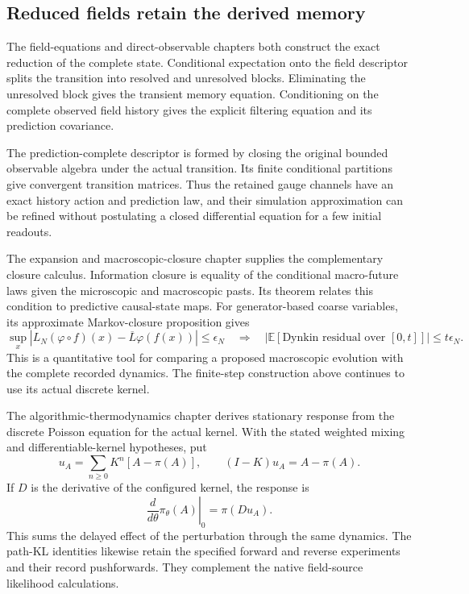 \documentclass[11pt,a4paper]{article}
\begin{document}
\subsection*{Reduced fields retain the derived memory}
The field-equations and direct-observable chapters both construct the exact reduction of the complete state. Conditional expectation onto the field descriptor splits the transition into resolved and unresolved blocks. Eliminating the unresolved block gives the transient memory equation. Conditioning on the complete observed field history gives the explicit filtering equation and its prediction covariance.

The prediction-complete descriptor is formed by closing the original bounded observable algebra under the actual transition. Its finite conditional partitions give convergent transition matrices. Thus the retained gauge channels have an exact history action and prediction law, and their simulation approximation can be refined without postulating a closed differential equation for a few initial readouts.

The expansion and macroscopic-closure chapter supplies the complementary closure calculus. Information closure is equality of the conditional macro-future laws given the microscopic and macroscopic pasts. Its theorem relates this condition to predictive causal-state maps. For generator-based coarse variables, its approximate Markov-closure proposition gives
\[
\sup_x|L_N(\varphi\circ f)(x)-\overline L\varphi(f(x))|
\le\epsilon_N
\quad\Longrightarrow\quad
|\mathbb E[\text{Dynkin residual over }[0,t]]|\le t\epsilon_N.
\]
This is a quantitative tool for comparing a proposed macroscopic evolution with the complete recorded dynamics. The finite-step construction above continues to use its actual discrete kernel.

The algorithmic-thermodynamics chapter derives stationary response from the discrete Poisson equation for the actual kernel. With the stated weighted mixing and differentiable-kernel hypotheses, put
\[
u_A=\sum_{n\ge0}K^n[A-\pi(A)],\qquad (I-K)u_A=A-\pi(A).
\]
If \(D\) is the derivative of the configured kernel, the response is
\[
\left.\frac{d}{d\theta}\pi_\theta(A)\right|_{0}=\pi(Du_A).
\]
This sums the delayed effect of the perturbation through the same dynamics. The path-KL identities likewise retain the specified forward and reverse experiments and their record pushforwards. They complement the native field-source likelihood calculations.
\end{document}
